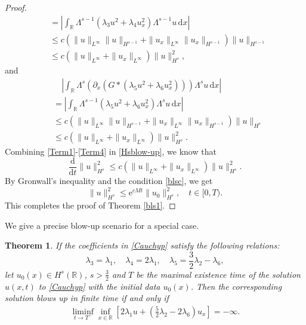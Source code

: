 \documentclass[11pt]{article}
\newtheorem{theorem}{Theorem}
\begin{document}
\begin{proof}
\begin{equation}
\begin{aligned}
&=\left|\int_{\mathbb{R}}\Lambda^{s-1}( \lambda_3 u^2 + \lambda_4 u_x^2)\Lambda^{s-1}u \,\mathrm{d}x\right|\\
&\leq c(\|u\|_{L^\infty}\|u\|_{H^{s-1}}+\|u_x\|_{L^\infty}\|u_x\|_{H^{s-1}})\|u\|_{H^{s-1}}\\
&\leq c(\|u\|_{L^\infty}+\|u_x\|_{L^\infty})\|u\|_{H^{s}}^2,
\end{aligned}
\end{equation}
and
\begin{equation}\label{Term4}
\begin{aligned}
&\quad\left|\int_{\mathbb{R}}\Lambda^s( \partial_x(G\ast(\lambda_5 u^2 + \lambda_6 u_x^2)))\Lambda^su \,\mathrm{d}x\right|\\
&=\left|\int_{\mathbb{R}}\Lambda^{s-1}( \lambda_5 u^2 + \lambda_6 u_x^2)\Lambda^{s}u \,\mathrm{d}x\right|\\
&\leq c(\|u\|_{L^\infty}\|u\|_{H^{s-1}}+\|u_x\|_{L^\infty}\|u_x\|_{H^{s-1}})\|u\|_{H^{s}}\\
&\leq c(\|u\|_{L^\infty}+\|u_x\|_{L^\infty})\|u\|_{H^{s}}^2.
\end{aligned}
\end{equation}
Combining \eqref{Term1}-\eqref{Term4} in \eqref{Hsblow-up}, we know that
\begin{equation*}
\frac{\mathrm{d}}{\mathrm{d}t}\|u\|_{H^s}^2\leq c(\|u\|_{L^\infty}+\|u_x\|_{L^\infty})\|u\|_{H^{s}}^2.
\end{equation*}
By Gronwall's inequality and the condition \eqref{blsc}, we get
\begin{equation*}
\|u\|_{H^s}^2\leq \mathrm{e}^{cMt}\|u_0\|_{H^s}^2, \quad t\in [0,T).
\end{equation*}
This completes the proof of Theorem \ref{bls1}.
\end{proof}

We give a precise blow-up scenario for a special case.
\begin{theorem}\label{bls2}
If the coefficients in \eqref{Cauchyp} satisfy the following relations:
\begin{equation}\label{constraintsforbu}
\lambda_3 = \lambda_1,\quad \lambda_4 = 2\lambda_1,\quad \lambda_5 = \frac32\lambda_2 - \lambda_6,
\end{equation}
let $u_0(x)\in H^s(\mathbb{R})$, $s>\tfrac{3}{2}$ and $T$ be the maximal existence time of the solution $u(x,t)$ to \eqref{Cauchyp} with the initial data
$u_0(x)$. Then the corresponding solution blows up in finite time if and only if
\begin{eqnarray*}
\liminf_{t\rightarrow T^-}\inf_{x\in\mathbb{R}}\left[2\lambda_1u+\left(\frac{5}{2}\lambda_2-2\lambda_6\right)u_x\right]=-\infty.
\end{eqnarray*}
\end{theorem}
\end{document}

